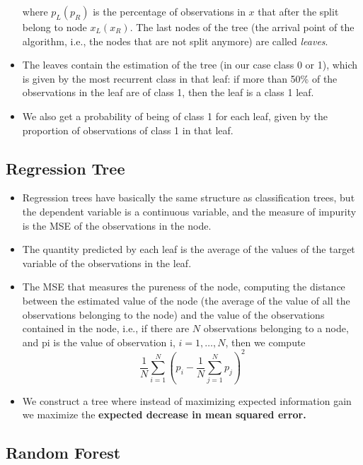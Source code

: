 \begin{itemize}
          where $p_{L}( p_{R})$ is the percentage of observations in $x$ that after the split belong to node $x_{L}( x_{R})$. The last nodes of the tree (the arrival point of the algorithm, i.e., the nodes that are not split anymore) are called \textit{leaves}. 
    \item The leaves contain the estimation of the tree (in our case class 0 or 1), which is given by the most recurrent class in that leaf: if more than 50\% of the observations in the leaf are of class 1, then the leaf is a class 1 leaf.
    \item We also get a probability of being of class 1 for each leaf, given by the proportion of observations of class 1 in that leaf.
\end{itemize}

\subsection{Regression Tree}

\begin{itemize}
    \item Regression trees have basically the same structure as classification trees, but the dependent variable is a continuous variable, and the measure of impurity is the MSE of the observations in the node. 
    \item The quantity predicted by each leaf is the average of the values of the target variable of the observations in the leaf.
    \item The MSE that measures the pureness of the node, computing the distance between the estimated value of the node (the average of the value of all the observations belonging to the node) and the value of the observations contained in the node, i.e., if there are $N$ observations belonging to a node, and pi is the value of observation i, $i=1,\dotsc ,N$, then we compute
          \begin{equation*}
              \frac{1}{N}\sum\limits _{i=1}^{N}\left( p_{i} -\frac{1}{N}\sum\limits _{j=1}^{N} p_{j}\right)^{2}
          \end{equation*}
    \item We construct a tree where instead of maximizing expected information gain we maximize the \textbf{expected decrease in mean squared error.}
\end{itemize}

\subsection{Random Forest}

